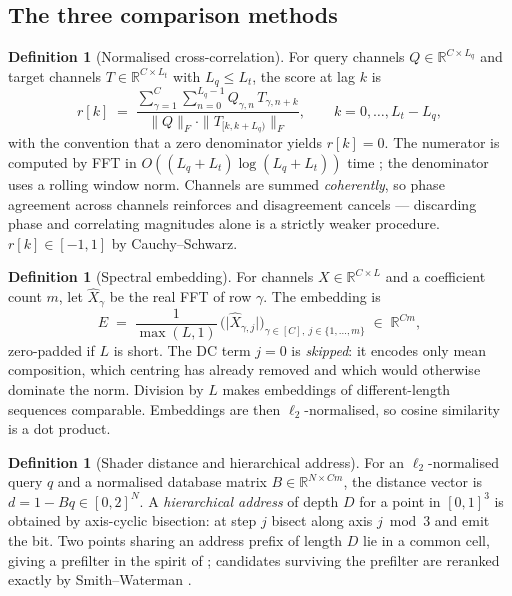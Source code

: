 \documentclass[11pt,twocolumn,a4paper]{article}
\theoremstyle{plain}
\theoremstyle{definition}
\newtheorem{definition}[theorem]{Definition}
\theoremstyle{remark}
\begin{document}
\subsection{The three comparison methods}

\begin{definition}[Normalised cross-correlation]
\label{def:xcorr}
For query channels $Q\in\mathbb{R}^{C\times L_q}$ and target channels
$T\in\mathbb{R}^{C\times L_t}$ with $L_q\le L_t$, the score at lag $k$ is
\[
  r[k]\;=\;
  \frac{\sum_{\gamma=1}^{C}\sum_{n=0}^{L_q-1} Q_{\gamma,n}\,T_{\gamma,n+k}}
       {\|Q\|_F \cdot \|T_{[k,k+L_q)}\|_F},
  \qquad k=0,\dots,L_t-L_q,
\]
with the convention that a zero denominator yields $r[k]=0$. The
numerator is computed by FFT in $O((L_q+L_t)\log(L_q+L_t))$ time
\cite{cooley1965algorithm}; the denominator uses a rolling window norm.
Channels are summed \emph{coherently}, so phase agreement across
channels reinforces and disagreement cancels --- discarding phase and
correlating magnitudes alone is a strictly weaker procedure.
$r[k]\in[-1,1]$ by Cauchy--Schwarz.
\end{definition}

\begin{definition}[Spectral embedding]
\label{def:spectral}
For channels $X\in\mathbb{R}^{C\times L}$ and a coefficient count $m$,
let $\hat X_\gamma$ be the real FFT of row $\gamma$. The embedding is
\[
  E \;=\; \frac{1}{\max(L,1)}\,
  \Big(\big|\hat X_{\gamma,j}\big|\Big)_{\gamma\in[C],\ j\in\{1,\dots,m\}}
  \;\in\;\mathbb{R}^{Cm},
\]
zero-padded if $L$ is short. The DC term $j=0$ is \emph{skipped}: it
encodes only mean composition, which centring has already removed and
which would otherwise dominate the norm. Division by $L$ makes
embeddings of different-length sequences comparable. Embeddings are then
$\ell_2$-normalised, so cosine similarity is a dot product.
\end{definition}

\begin{definition}[Shader distance and hierarchical address]
\label{def:shader}
For an $\ell_2$-normalised query $q$ and a normalised database matrix
$B\in\mathbb{R}^{N\times Cm}$, the distance vector is $d = 1 - Bq \in
[0,2]^N$. A \emph{hierarchical address} of depth $D$ for a point in
$[0,1]^3$ is obtained by axis-cyclic bisection: at step $j$ bisect along
axis $j\bmod 3$ and emit the bit. Two points sharing an address prefix
of length $D$ lie in a common cell, giving a prefilter in the spirit of
\cite{morton1966computer,bentley1975multidimensional}; candidates
surviving the prefilter are reranked exactly by Smith--Waterman
\cite{smith1981identification}.
\end{definition}
\end{document}
